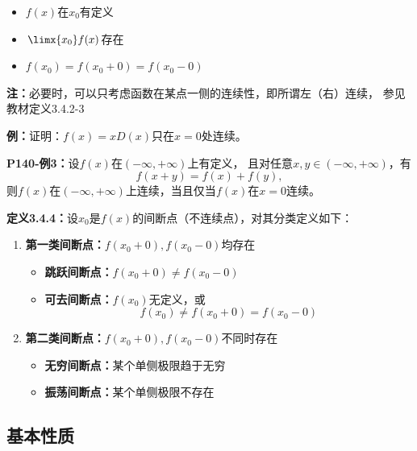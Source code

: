 \begin{itemize}
  \item $f(x)$在$x_0$有定义 
  \item $\limx{x_0}f(x)$存在 
  \item $f(x_0)=f(x_0+0)=f(x_0-0)$
\end{itemize}

{\bf 注：}必要时，可以只考虑函数在某点一侧的连续性，即所谓左（右）连续，
参见教材定义3.4.2-3

{\bf 例：}证明：$f(x)=xD(x)$只在$x=0$处连续。

{\bf P140-例3：}设$f(x)$在$(-\infty,+\infty)$上有定义，
且对任意$x,y\in (-\infty,+\infty)$，有
$$f(x+y)=f(x)+f(y),$$
则$f(x)$在$(-\infty,+\infty)$上连续，当且仅当$f(x)$在$x=0$连续。

\begin{center}
\end{center}

{\bf 定义3.4.4：}设$x_0$是$f(x)$的间断点（不连续点），对其分类定义如下：
\begin{enumerate}[(1)]
  \setlength{\itemindent}{1cm}
  \item {\bf 第一类间断点：}$f(x_0+0),f(x_0-0)$均存在
  \begin{itemize}
    \item {\bf 跳跃间断点：}$f(x_0+0)\ne f(x_0-0)$
    \item {\bf 可去间断点：}$f(x_0)$无定义，或
    $$f(x_0)\ne f(x_0+0)=f(x_0-0)$$
  \end{itemize}
  \item {\bf 第二类间断点：}$f(x_0+0),f(x_0-0)$不同时存在
  \begin{itemize}
    \item {\bf 无穷间断点：}某个单侧极限趋于无穷
    \item {\bf 振荡间断点：}某个单侧极限不存在
  \end{itemize}
\end{enumerate}

\subsection{基本性质}

